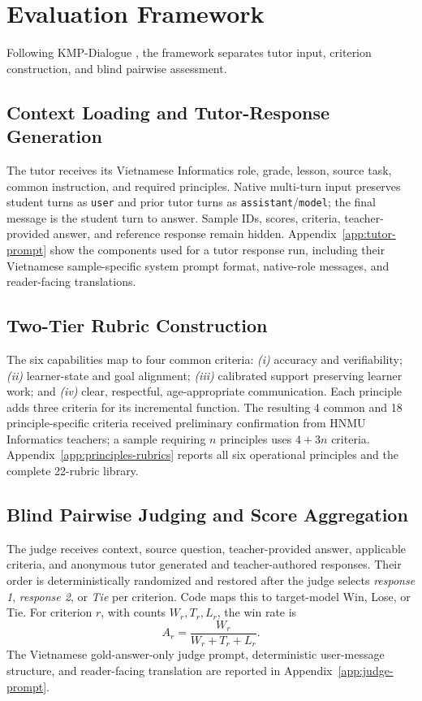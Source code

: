 \documentclass[conference]{IEEEtran}
\begin{document}
\section{Evaluation Framework}

Following KMP-Dialogue \cite{shi2026kmpbench}, the framework separates tutor
input, criterion construction, and blind pairwise assessment.

\subsection{Context Loading and Tutor-Response Generation}

The tutor receives its Vietnamese Informatics role, grade, lesson, source
task, common instruction, and required principles. Native multi-turn input
preserves student turns as \texttt{user} and prior tutor turns as
\texttt{assistant}/\texttt{model}; the final message is the student turn to
answer. Sample IDs, scores, criteria, teacher-provided answer, and
reference response remain hidden. Appendix~\ref{app:tutor-prompt} show the components
used for a tutor response run, including their Vietnamese sample-specific system prompt format, 
native-role messages, and reader-facing translations.

\subsection{Two-Tier Rubric Construction}

The six capabilities map to four common criteria: \textit{(i)} accuracy and
verifiability; \textit{(ii)} learner-state and goal alignment; \textit{(iii)}
calibrated support preserving learner work; and \textit{(iv)} clear,
respectful, age-appropriate communication. Each principle adds three criteria
for its incremental function. The resulting 4 common and 18
principle-specific criteria received preliminary confirmation from HNMU
Informatics teachers; a sample requiring \(n\) principles uses \(4+3n\)
criteria. Appendix~\ref{app:principles-rubrics} reports all six operational
principles and the complete 22-rubric library.

\subsection{Blind Pairwise Judging and Score Aggregation}

The judge receives context, source question, teacher-provided answer,
applicable criteria, and anonymous tutor generated and teacher-authored responses.
Their order is deterministically randomized and restored after the judge
selects \textit{response 1}, \textit{response 2}, or \textit{Tie} per
criterion. Code maps this to target-model Win, Lose, or Tie. For criterion
\(r\), with counts \(W_r,T_r,L_r\), the win rate is
\[
 A_r = \frac{W_r}{W_r+T_r+L_r}.
\]
The Vietnamese gold-answer-only judge prompt, deterministic user-message
structure, and reader-facing translation are reported in
Appendix~\ref{app:judge-prompt}.
\end{document}
